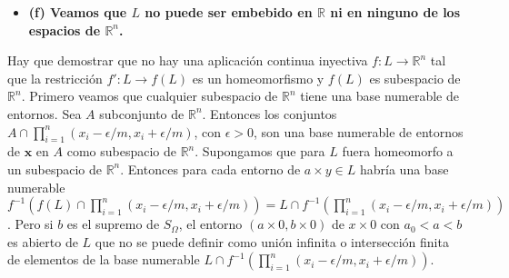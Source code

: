\documentclass{article}
\newcommand{\vect}[1]{\boldsymbol{#1}}
\begin{document}
\begin{itemize}
\item \bf (f) \rm Veamos que $L$ no puede ser embebido en $\mathbb{R}$ ni en ninguno de los espacios de $\mathbb{R}^n$.
\end{itemize}
Hay que demostrar que no hay una aplicación continua inyectiva $f:L\rightarrow \mathbb{R}^n$ tal que la restricción $f':L\rightarrow f(L)$ es un homeomorfismo y $f(L)$ es subespacio de $\mathbb{R}^n$.
Primero veamos que cualquier subespacio de $\mathbb{R}^n$ tiene una base numerable de entornos. Sea $A$ subconjunto de $\mathbb{R}^n$. Entonces los conjuntos $A\cap \prod_{i=1}^n(x_i-\epsilon/m,x_i+\epsilon/m)$, con $\epsilon>0$, son una base numerable de entornos de $\vect{x}$ en $A$ como subespacio de $\mathbb{R}^n$. Supongamos que para $L$ fuera homeomorfo a un subespacio de $\mathbb{R}^n$. Entonces para cada entorno de $a\times y\in L$ habría una base numerable $f^{-1}\left(f(L)\cap \prod_{i=1}^n(x_i-\epsilon/m,x_i+\epsilon/m)\right)=L\cap f^{-1}\left(\prod_{i=1}^n(x_i-\epsilon/m,x_i+\epsilon/m)\right)$. Pero si $b$ es el supremo de $S_\Omega$, el entorno $(a\times 0,b\times 0)$ de $x\times 0$ con $a_0<a<b$ es abierto de $L$ que no se puede definir como unión infinita o intersección finita de elementos de la base numerable $L\cap f^{-1}\left(\prod_{i=1}^n(x_i-\epsilon/m,x_i+\epsilon/m)\right)$.
\end{document}
